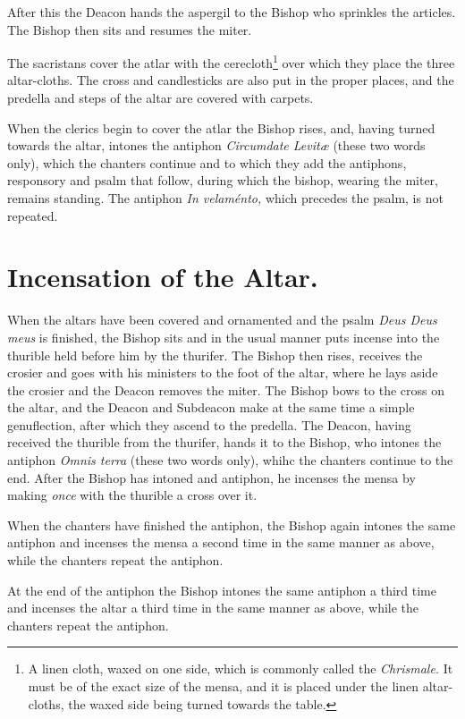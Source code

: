 \documentclass[letterpaper]{report}
\begin{document}
{After this the Deacon hands the aspergil to the Bishop who sprinkles the
articles. The Bishop then sits and resumes the miter.

\rubric The sacristans cover the atlar with the cerecloth\footnote{A linen
cloth, waxed on one side, which is commonly called the \textit{Chrismale.} It
must be of the exact size of the mensa, and it is placed under the linen
altar-cloths, the waxed side being turned towards the table.} over which they
place the three altar-cloths. The cross and candlesticks are also put in the
proper places, and the predella and steps of the altar are covered with
carpets.

When the clerics begin to cover the atlar the Bishop rises, and, having turned
towards the altar, intones the antiphon \textit{Circumdate Levit\ae} (these two
words only), which the chanters continue and to which they add the antiphons,
responsory and psalm that follow, during which the bishop, wearing the miter,
remains standing. The antiphon \textit{In velaménto,} which precedes the psalm,
is not repeated.

\section{Incensation of the Altar.}

\rubric When the altars have been covered and ornamented and the psalm
\textit{Deus Deus meus} is finished, the Bishop sits and in the usual manner
puts incense into the thurible held before him by the thurifer. The Bishop then
rises, receives the crosier and goes with his ministers to the foot of the
altar, where he lays aside the crosier and the Deacon removes the miter. The
Bishop bows to the cross on the altar, and the Deacon and Subdeacon make at the
same time a simple genuflection, after which they ascend to the predella. The
Deacon, having received the thurible from the thurifer, hands it to the Bishop,
who intones the antiphon \textit{Omnis terra} (these two words only), whihc the
chanters continue to the end. After the Bishop has intoned and antiphon, he
incenses the mensa by making \textit{once} with the thurible a cross over it.

When the chanters have finished the antiphon, the Bishop again intones the same
antiphon and incenses the mensa a second time in the same manner as above,
while the chanters repeat the antiphon.

At the end of the antiphon the Bishop intones the same antiphon a third time
and incenses the altar a third time in the same manner as above, while the
chanters repeat the antiphon.

}
\end{document}
